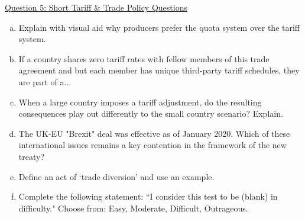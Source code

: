 \documentclass[12pt]{article}
\begin{document}
\newpage

\noindent \underline{Question 5: Short Tariff \& Trade Policy Questions}

\begin{enumerate}[a)]

\item Explain with visual aid why producers prefer the quota system over the tariff system.

\vspace{4in}

\item If a country shares zero tariff rates with fellow members of this trade agreement and but each member has unique third-party tariff schedules, they are part of a...

\vspace{2in}

\newpage

\item When a large country imposes a tariff adjustment, do the resulting consequences play out differently to the small country scenario? Explain.


\vspace{1.5in}

\item The UK-EU "Brexit" deal was effective as of January 2020. Which of these international issues remains a key contention in the framework of the new treaty?

\vspace{1.5in}

\item Define an act of `trade diversion' and use an example.

\vspace{1.5in}

\item Complete the following statement: ``I consider this test to be (blank) in difficulty." 
Choose from: Easy, Moderate, Difficult, Outrageous.

\end{enumerate}
\end{document}

